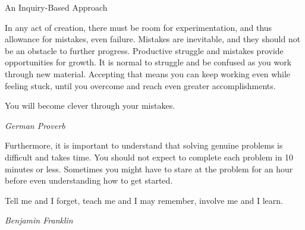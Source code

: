 \begin{section}{An Inquiry-Based Approach}

In any act of creation, there must be room for experimentation, and thus allowance for mistakes, even failure. Mistakes are inevitable, and they should not be an obstacle to further progress. Productive struggle and mistakes provide opportunities for growth.  It is normal to struggle and be confused as you work through new material. Accepting that means you can keep working even while feeling stuck, until you overcome and reach even greater accomplishments.


\epigraph{You will become clever through your mistakes.}{\emph{German Proverb}}

Furthermore, it is important to understand that solving genuine problems is difficult and takes time.  You should not expect to complete each problem in 10 minutes or less.  Sometimes you might have to stare at the problem for an hour before even understanding how to get started.


\epigraph{Tell me and I forget, teach me and I may remember, involve me and I learn.}{\emph{Benjamin Franklin}}

\end{section}

